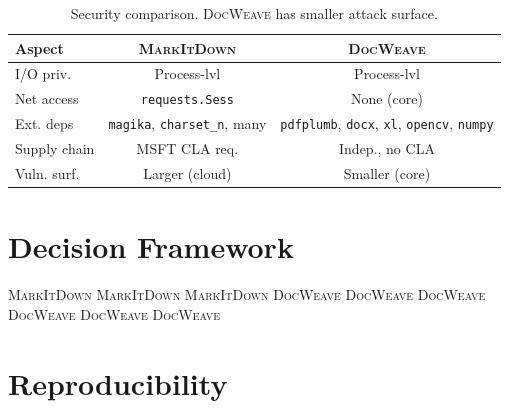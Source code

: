 \documentclass[10pt, conference, compsocconf]{IEEEtran}
\theoremstyle{plain}
\newcommand{\docweave}{\textsc{DocWeave}}
\newcommand{\markitdown}{\textsc{MarkItDown}}
\begin{document}
\begin{table}[H]
\centering
\caption{Security comparison. \docweave{} has smaller attack surface.}
\label{tab:security}
\footnotesize
\begin{tabular*}{\columnwidth}{@{\extracolsep{\fill}}lcc@{}}
\toprule
\textbf{Aspect} & \textbf{\markitdown{}} & \textbf{\docweave{}} \\
\midrule
I/O priv.       & Process-lvl      & Process-lvl \\
Net access      & \texttt{requests.Sess} & None (core) \\
Ext. deps       & \texttt{magika}, \texttt{charset\_n}, many & \texttt{pdfplumb}, \texttt{docx}, \texttt{xl}, \texttt{opencv}, \texttt{numpy} \\
Supply chain    & MSFT CLA req.    & Indep., no CLA \\
Vuln. surf.     & Larger (cloud)   & Smaller (core) \\
\bottomrule
\end{tabular*}
\end{table}

\section{Decision Framework}
\label{sec:decision}

\begin{algorithm}[H]
\caption{System Selection Decision Tree}
\begin{algorithmic}
    \State \Return \markitdown{}
    \State \Return \markitdown{}
    \State \Return \markitdown{}
    \State \Return \docweave{}
    \State \Return \docweave{}
    \State \Return \docweave{}
    \State \Return \docweave{}
    \State \Return \docweave{}
\Else
    \State \Return \docweave{} 
\EndIf
\end{algorithmic}
\end{algorithm}

\section{Reproducibility}
\label{sec:repro}
\end{document}
